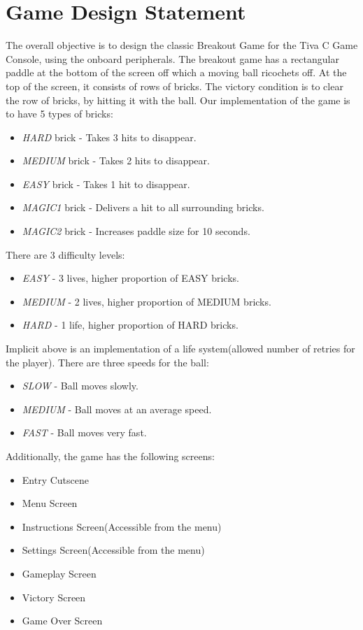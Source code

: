 \documentclass{article}
\begin{document}
\section{Game Design Statement}
\qquad The overall objective is to design the classic Breakout Game for the Tiva C Game Console, using the onboard peripherals.
The breakout game has a rectangular paddle at the bottom of the screen off which a moving ball ricochets off. At the top of the screen, it consists of rows of bricks. The victory condition is to clear the row of bricks, by hitting it with the ball. Our implementation of the game is to have 5 types of bricks:
\begin{itemize}
  \item \textit{HARD} brick - Takes 3 hits to disappear.
  \item \textit{MEDIUM} brick - Takes 2 hits to disappear.
  \item \textit{EASY} brick - Takes 1 hit to disappear.
  \item \textit{MAGIC1} brick - Delivers a hit to all surrounding bricks.
  \item \textit{MAGIC2} brick - Increases paddle size for 10 seconds.
\end{itemize}
There are 3 difficulty levels:
\begin{itemize}
  \item \textit{EASY} - 3 lives, higher proportion of EASY bricks.
  \item \textit{MEDIUM} - 2 lives, higher proportion of MEDIUM bricks.
  \item \textit{HARD} - 1 life, higher proportion of HARD bricks.
\end{itemize}
Implicit above is an implementation of a life system(allowed number of retries for the player). There are three speeds for the ball:
\begin{itemize}
  \item \textit{SLOW} - Ball moves slowly.
  \item \textit{MEDIUM} - Ball moves at an average speed.
  \item \textit{FAST} - Ball moves very fast.
\end{itemize}
Additionally, the game has the following screens:
\begin{itemize}
  \item Entry Cutscene
  \item Menu Screen
  \item Instructions Screen(Accessible from the menu)
  \item Settings Screen(Accessible from the menu)
  \item Gameplay Screen
  \item Victory Screen
  \item Game Over Screen
\end{itemize}
\end{document}
